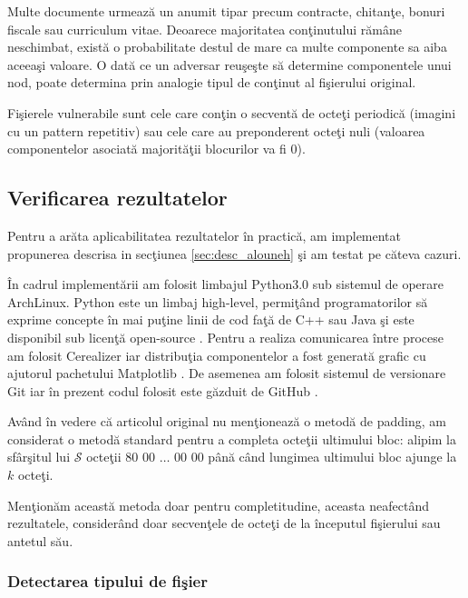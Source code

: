 \documentclass{llncs}
\begin{document}
Multe documente urmeaz\u{a} un anumit tipar precum contracte, chitan\c{t}e, bonuri fiscale sau curriculum vitae. Deoarece majoritatea con\c{t}inutului r\u{a}m\^{a}ne neschimbat, exist\u{a} o probabilitate destul de mare ca multe componente sa aiba aceea\c{s}i valoare. O dat\u{a} ce un adversar reu\c{s}e\c{s}te s\u{a} determine componentele unui nod, poate determina prin analogie tipul de con\c{t}inut al fi\c{s}ierului original.

Fi\c{s}ierele vulnerabile sunt cele care con\c{t}in o secvent\u{a} de octe\c{t}i periodic\u{a} (imagini cu un pattern repetitiv) sau cele care au preponderent octe\c{t}i nuli (valoarea componentelor asociat\u{a} majorit\u{a}\c{t}ii blocurilor va fi $0$).


\subsection{Verificarea rezultatelor}
Pentru a ar\u{a}ta aplicabilitatea rezultatelor \^{i}n practic\u{a}, am implementat propunerea descrisa in sec\c{t}iunea {\ref{sec:desc_alouneh}} \c{s}i am testat pe c\u{a}teva cazuri.

\^{I}n cadrul implement\u{a}rii am folosit limbajul Python3.0 sub sistemul de operare ArchLinux. Python este un limbaj high-level, permi\c{t}\^{a}nd programatorilor s\u{a} exprime concepte \^{i}n mai pu\c{t}ine linii de cod fa\c{t}\u{a} de C++ sau Java \c{s}i este disponibil sub licen\c{t}\u{a} open-source \cite{Python:2015}.
Pentru a realiza comunicarea \^{i}ntre procese am folosit Cerealizer iar distribu\c{t}ia componentelor a fost generat\u{a} grafic cu ajutorul pachetului Matplotlib \cite{Hunter:2007, PyCerealizer:2015}. De asemenea am folosit sistemul de versionare Git iar \^{i}n prezent codul folosit este g\u{a}zduit de GitHub \cite{Github:2015, CodeGit:2015}.

Av\^{a}nd \^{i}n vedere c\u{a} articolul original nu men\c{t}ioneaz\u{a} o metod\u{a} de padding, am considerat o metod\u{a} standard pentru a completa octe\c{t}ii ultimului bloc: alipim la sf\^{a}r\c{s}itul lui $\mathcal{S}$ octe\c{t}ii $80$ $00$ $\dots$ $00$ $00$ p\^{a}n\u{a} c\^{a}nd lungimea ultimului bloc ajunge la $k$ octe\c{t}i.

Men\c{t}ion\u{a}m aceast\u{a} metoda doar pentru completitudine, aceasta neafect\^{a}nd rezultatele, consider\^{a}nd doar secven\c{t}ele de octe\c{t}i de la \^{i}nceputul fi\c{s}ierului sau antetul s\u{a}u.

\subsubsection{Detectarea tipului de fi\c{s}ier}\hspace*{\fill} \\
\end{document}
